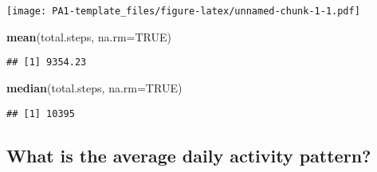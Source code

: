 \documentclass[
]{article}
\newenvironment{Shaded}{\begin{snugshade}}{\end{snugshade}}
\newcommand{\DataTypeTok}[1]{\textcolor[rgb]{0.13,0.29,0.53}{#1}}
\newcommand{\KeywordTok}[1]{\textcolor[rgb]{0.13,0.29,0.53}{\textbf{#1}}}
\newcommand{\NormalTok}[1]{#1}
\newcommand{\OperatorTok}[1]{\textcolor[rgb]{0.81,0.36,0.00}{\textbf{#1}}}
\newcommand{\OtherTok}[1]{\textcolor[rgb]{0.56,0.35,0.01}{#1}}
\newcommand{\StringTok}[1]{\textcolor[rgb]{0.31,0.60,0.02}{#1}}
\begin{document}
\texttt{[image: PA1-template\_files/figure-latex/unnamed-chunk-1-1.pdf]}

\begin{Shaded}
\begin{Highlighting}[]
\KeywordTok{mean}\NormalTok{(total.steps, }\DataTypeTok{na.rm=}\OtherTok{TRUE}\NormalTok{)}
\end{Highlighting}
\end{Shaded}

\begin{verbatim}
## [1] 9354.23
\end{verbatim}

\begin{Shaded}
\begin{Highlighting}[]
\KeywordTok{median}\NormalTok{(total.steps, }\DataTypeTok{na.rm=}\OtherTok{TRUE}\NormalTok{)}
\end{Highlighting}
\end{Shaded}

\begin{verbatim}
## [1] 10395
\end{verbatim}

\hypertarget{what-is-the-average-daily-activity-pattern}{%
\subsection{What is the average daily activity
pattern?}\label{what-is-the-average-daily-activity-pattern}}

\begin{Shaded}
\end{Shaded}
\end{document}
